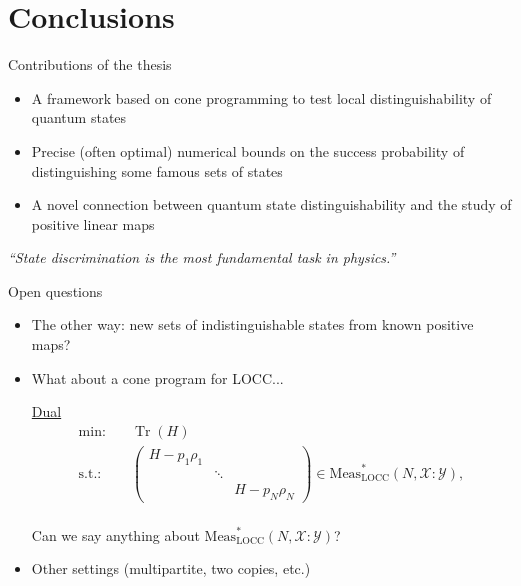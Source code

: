 \documentclass{beamer}
\newcommand{\tr}{\operatorname{Tr}}
\def\X{\mathcal{X}}
\def\Y{\mathcal{Y}}
\newcommand{\setft}[1]{\mathrm{#1}}
\newcommand{\LOCC}{\setft{LOCC}}
\newcommand{\Meas}{\setft{Meas}}
\begin{document}
  \section{Conclusions}
    \begin{frame}{Contributions of the thesis}
        \begin{itemize}
         \itemsep2em
            \item A framework based on cone programming to test local distinguishability 
                of quantum states
            \item Precise (often optimal) numerical bounds on the success probability of 
                distinguishing some famous sets of states
            \item A novel connection between quantum state distinguishability and the study of 
                positive linear maps
        \end{itemize}
        \begin{exampleblock}{}
          {\large\emph{``State discrimination is the most fundamental task in physics.''}}
          \vskip5mm
          \hspace*{}
        \end{exampleblock}
    \end{frame}
        
      \begin{frame}{Open questions}
        \begin{itemize}
        \itemsep1em
          \item The other way: new sets of indistinguishable states from known positive maps?
          \item What about a cone program for LOCC... 
            \begin{center}
            \underline{Dual}
              \begin{equation*}
                \label{eq:locc-dual-problem}
                \begin{split}
                  \text{min:} \quad & \tr(H)\\
                  \text{s.t.:}
                   \quad & 
                    \begin{pmatrix}
                        H - p_{1}\rho_{1} & & \\
                         & \ddots & \\
                         & & H - p_{N}\rho_{N}
                   \end{pmatrix}\in \boxed{\Meas_{\LOCC}^{\ast}(N, \X:\Y)},\\
                \end{split}
              \end{equation*}
            \end{center}
            Can we say anything about $\Meas_{\LOCC}^{\ast}(N, \X:\Y)$?
          \item Other settings (multipartite, two copies, etc.)
        \end{itemize}
    \end{frame}
\end{document}
